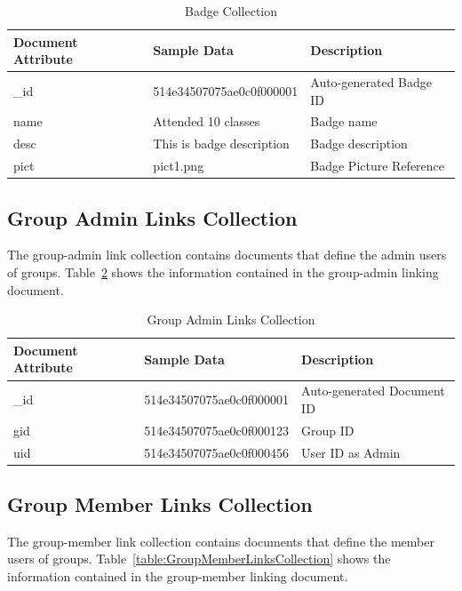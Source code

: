 \begin{table}[H]
\caption{Badge Collection}\label{table:BadgeCollection}
\textbf{ }
\begin{center}
\begin{tabular}{ | l | l |  l | }
\hline
Document Attribute & Sample Data & Description \\ \hline
{\_}id & 514e34507075ae0c0f000001 & Auto-generated Badge ID \\ \hline
name & Attended 10 classes & Badge name   \\ \hline
desc & This is badge description & Badge description   \\ \hline
pict & pict1.png & Badge Picture Reference   \\ \hline
\end{tabular}
\end{center}
\end{table}


\subsection{Group Admin Links Collection}
The group-admin link collection contains documents that define the admin users of groups.  Table~\ref{table:GroupAdminLinksCollection} shows the information contained in the group-admin linking document.

\begin{table}[H]
\caption{Group Admin Links Collection}\label{table:GroupAdminLinksCollection}
\textbf{ }
\begin{center}
\begin{tabular}{ | l | l |  l | }
\hline
Document Attribute & Sample Data & Description \\ \hline
{\_}id & 514e34507075ae0c0f000001 & Auto-generated Document ID \\ \hline
gid & 514e34507075ae0c0f000123 & Group ID   \\ \hline
uid & 514e34507075ae0c0f000456 & User ID as Admin   \\ \hline
\end{tabular}
\end{center}
\end{table}

\subsection{Group Member Links Collection}
The group-member link collection contains documents that define the member users of groups. Table~\ref{table:GroupMemberLinksCollection} shows the information contained in the group-member linking document.

